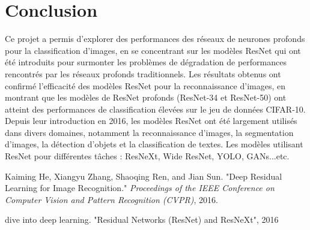 \documentclass{article}
\begin{document}
\section{Conclusion}

Ce projet a permis d'explorer des performances des réseaux de neurones profonds pour la classification d'images, en se concentrant sur les modèles ResNet qui ont été introduits pour surmonter les problèmes de dégradation de performances rencontrés par les réseaux profonds traditionnels.
Les résultats obtenus ont confirmé l'efficacité des modèles ResNet pour la reconnaissance d'images, en montrant que les modèles de ResNet profonds (ResNet-34 et ResNet-50) ont atteint des performances de classification élevées sur le jeu de données CIFAR-10.
Depuis leur introduction en 2016, les modèles ResNet ont été largement utilisés dans divers domaines, notamment la reconnaissance d'images, la segmentation d'images, la détection d'objets et la classification de textes. Les modèles utilisant ResNet pour différentes tâches : ResNeXt, Wide ResNet, YOLO, GANs...etc.


\begin{thebibliography}{9}
Kaiming He, Xiangyu Zhang, Shaoqing Ren, and Jian Sun. "Deep Residual Learning for Image Recognition." \emph{Proceedings of the IEEE Conference on Computer Vision and Pattern Recognition (CVPR)}, 2016.

dive into deep learning. "Residual Networks (ResNet) and ResNeXt", 2016
\end{thebibliography}
\end{document}

